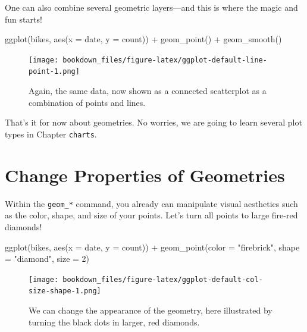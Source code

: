 \documentclass[
]{krantz}
\makeatletter
\newenvironment{Shaded}{\begin{snugshade}}{\end{snugshade}}
\newcommand{\AttributeTok}[1]{\textcolor[rgb]{0.61,0.61,0.61}{#1}}
\newcommand{\DecValTok}[1]{\textcolor[rgb]{0.06,0.06,0.06}{#1}}
\newcommand{\FunctionTok}[1]{\textcolor[rgb]{0,0,0}{#1}}
\newcommand{\NormalTok}[1]{#1}
\newcommand{\SpecialCharTok}[1]{\textcolor[rgb]{0,0,0}{#1}}
\newcommand{\StringTok}[1]{\textcolor[rgb]{0.5,0.5,0.5}{#1}}
\newenvironment{kframe}{%
\medskip{}
\setlength{\fboxsep}{.8em}
 \def\at@end@of@kframe{}%
 \ifinner\ifhmode%
  \def\at@end@of@kframe{\end{minipage}}%
  \begin{minipage}{\columnwidth}%
 \fi\fi%
 \def\FrameCommand##1{\hskip\@totalleftmargin \hskip-\fboxsep
 \colorbox{shadecolor}{##1}\hskip-\fboxsep
     \hskip-\linewidth \hskip-\@totalleftmargin \hskip\columnwidth}%
 \MakeFramed {\advance\hsize-\width
   \@totalleftmargin\z@ \linewidth\hsize
   \@setminipage}}%
 {\par\unskip\endMakeFramed%
 \at@end@of@kframe}
\renewenvironment{Shaded}{\begin{kframe}}{\end{kframe}}
\makeatother
\begin{document}
One can also combine several geometric layers---and this is where the magic and fun starts!

\begin{Shaded}
\begin{Highlighting}[]
\FunctionTok{ggplot}\NormalTok{(bikes, }\FunctionTok{aes}\NormalTok{(}\AttributeTok{x =}\NormalTok{ date, }\AttributeTok{y =}\NormalTok{ count)) }\SpecialCharTok{+} 
  \FunctionTok{geom\_point}\NormalTok{() }\SpecialCharTok{+} 
  \FunctionTok{geom\_smooth}\NormalTok{()}
\end{Highlighting}
\end{Shaded}

\begin{figure}
\centering
\texttt{[image: bookdown\_files/figure-latex/ggplot-default-line-point-1.png]}
\caption{\label{fig:ggplot-default-line-point}Again, the same data, now shown as a connected scatterplot as a combination of points and lines.}
\end{figure}

That's it for now about geometries. No worries, we are going to learn several plot types in Chapter \texttt{charts}.

\hypertarget{prop}{%
\section{Change Properties of Geometries}\label{prop}}

Within the \texttt{geom\_*} command, you already can manipulate visual aesthetics such as the color, shape, and size of your points. Let's turn all points to large fire-red diamonds!

\begin{Shaded}
\begin{Highlighting}[]
\FunctionTok{ggplot}\NormalTok{(bikes, }\FunctionTok{aes}\NormalTok{(}\AttributeTok{x =}\NormalTok{ date, }\AttributeTok{y =}\NormalTok{ count)) }\SpecialCharTok{+} 
  \FunctionTok{geom\_point}\NormalTok{(}\AttributeTok{color =} \StringTok{"firebrick"}\NormalTok{, }\AttributeTok{shape =} \StringTok{"diamond"}\NormalTok{, }\AttributeTok{size =} \DecValTok{2}\NormalTok{)}
\end{Highlighting}
\end{Shaded}

\begin{figure}
\centering
\texttt{[image: bookdown\_files/figure-latex/ggplot-default-col-size-shape-1.png]}
\caption{\label{fig:ggplot-default-col-size-shape}We can change the appearance of the geometry, here illustrated by turning the black dots in larger, red diamonds.}
\end{figure}
\end{document}
